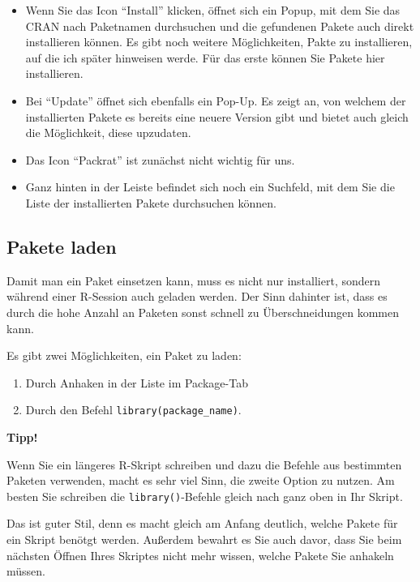 \documentclass[
]{book}
\begin{document}
\begin{itemize}
\item
  Wenn Sie das Icon ``Install'' klicken, öffnet sich ein Popup, mit dem Sie das CRAN nach Paketnamen durchsuchen und die gefundenen Pakete auch direkt installieren können. Es gibt noch weitere Möglichkeiten, Pakte zu installieren, auf die ich später hinweisen werde. Für das erste können Sie Pakete hier installieren.
\item
  Bei ``Update'' öffnet sich ebenfalls ein Pop-Up. Es zeigt an, von welchem der installierten Pakete es bereits eine neuere Version gibt und bietet auch gleich die Möglichkeit, diese upzudaten.
\item
  Das Icon ``Packrat'' ist zunächst nicht wichtig für uns.
\item
  Ganz hinten in der Leiste befindet sich noch ein Suchfeld, mit dem Sie die Liste der installierten Pakete durchsuchen können.
\end{itemize}

\hypertarget{pakete-laden}{%
\subsection{Pakete laden}\label{pakete-laden}}

Damit man ein Paket einsetzen kann, muss es nicht nur installiert, sondern während einer R-Session auch geladen werden. Der Sinn dahinter ist, dass es durch die hohe Anzahl an Paketen sonst schnell zu Überschneidungen kommen kann.

Es gibt zwei Möglichkeiten, ein Paket zu laden:

\begin{enumerate}
\def\labelenumi{\arabic{enumi}.}
\item
  Durch Anhaken in der Liste im Package-Tab
\item
  Durch den Befehl \texttt{library(package\_name)}.
\end{enumerate}

\textbf{Tipp!}

Wenn Sie ein längeres R-Skript schreiben und dazu die Befehle aus bestimmten Paketen verwenden, macht es sehr viel Sinn, die zweite Option zu nutzen. Am besten Sie schreiben die \texttt{library()}-Befehle gleich nach ganz oben in Ihr Skript.

Das ist guter Stil, denn es macht gleich am Anfang deutlich, welche Pakete für ein Skript benötgt werden. Außerdem bewahrt es Sie auch davor, dass Sie beim nächsten Öffnen Ihres Skriptes nicht mehr wissen, welche Pakete Sie anhakeln müssen.
\end{document}
